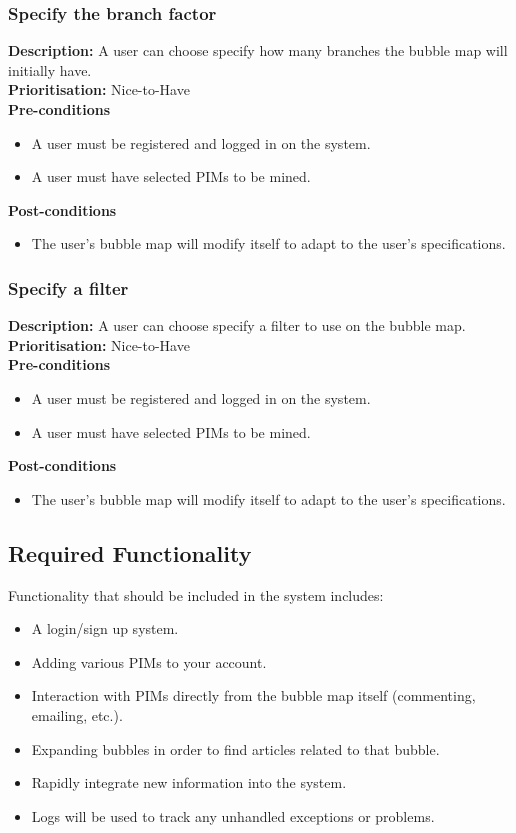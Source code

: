 \documentclass[hidelinks,english]{article}
\begin{document}
    		\subsubsection{Specify the branch factor}
				\textbf{Description:}  A user can choose specify how many branches the bubble map will initially have.\\
			    \textbf{Prioritisation:} Nice-to-Have\\
      			\textbf{Pre-conditions}
			    \begin{itemize}
			        \item A user must be registered and logged in on the system.
			        \item A user must have selected PIMs to be mined.
			    \end{itemize}
    			\textbf{Post-conditions}
			    \begin{itemize}
			    	\item The user's bubble map will modify itself to adapt to the user's specifications.
    			\end{itemize}
    			
    		\subsubsection{Specify a filter}
				\textbf{Description:}  A user can choose specify a filter to use on the bubble map.\\
			    \textbf{Prioritisation:} Nice-to-Have\\
    			\textbf{Pre-conditions}
			    \begin{itemize}
			        \item A user must be registered and logged in on the system.
			        \item A user must have selected PIMs to be mined.
			    \end{itemize}
    			\textbf{Post-conditions}
     			\begin{itemize}
        			\item The user's bubble map will modify itself to adapt to the user's specifications.
    			\end{itemize}
    			
		\subsection{Required Functionality}
			Functionality that should be included in the system includes:
			\begin{itemize}
				\item A login/sign up system. 
				\item Adding various PIMs to your account.
				\item Interaction with PIMs directly from the bubble map itself (commenting, emailing, etc.).
				\item Expanding bubbles in order to find articles related to that bubble.
				\item Rapidly integrate new information into the system.
				\item Logs will be used to track any unhandled exceptions or problems.
			\end{itemize}
		\newpage
\end{document}
